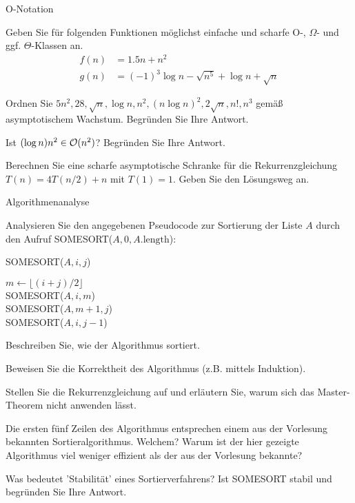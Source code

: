\documentclass{exercisesheet}
\begin{document}
\begin{exercises}{O-Notation}
\item Geben Sie für folgenden Funktionen möglichst einfache und scharfe O-, $\Omega$- und ggf. $\Theta$-Klassen an.
\begin{align*}
  f(n) & = 1.5n + n^2                                     \\
  g(n) & = (-1)^3 \log n - \sqrt{n^5} + \log n + \sqrt{n}
\end{align*}
\item Ordnen Sie $5n^2, 28, \sqrt{n}, \log n, n^2, (n \log n)^2, 2\sqrt{n}, n!, n^3$ gemäß asymptotischem Wachstum. Begründen Sie Ihre Antwort.
\item Ist $(\log n)n^2 \in \mathcal{O}(n^2)$? Begründen Sie Ihre Antwort.
\item Berechnen Sie eine scharfe asymptotische Schranke für die Rekurrenzgleichung $T(n) = 4T(n/2) + n$ mit $T(1) = 1$. Geben Sie den Lösungsweg an.
\end{exercises}

\begin{eexercises}{Algorithmenanalyse}{
    Analysieren Sie den angegebenen Pseudocode zur Sortierung der Liste $A$ durch den Aufruf SOMESORT($A, 0, A.\text{length}$):
    \begin{algorithm}[ht]
      \caption{SOMESORT($A, i, j$)}
      $m \gets \lfloor (i+j)/2 \rfloor$ \\
      SOMESORT($A, i, m$) \\
      SOMESORT($A, m+1, j$) \\
      SOMESORT($A, i, j-1$)
    \end{algorithm}
  }
  \item Beschreiben Sie, wie der Algorithmus sortiert.
  \item Beweisen Sie die Korrektheit des Algorithmus (z.B. mittels Induktion).
  \item Stellen Sie die Rekurrenzgleichung auf und erläutern Sie, warum sich das Master-Theorem nicht anwenden lässt.
  \item Die ersten fünf Zeilen des Algorithmus entsprechen einem aus der Vorlesung bekannten Sortieralgorithmus. Welchem? Warum ist der hier gezeigte Algorithmus viel weniger effizient als der aus der Vorlesung bekannte?
  \item Was bedeutet 'Stabilität' eines Sortierverfahrens? Ist SOMESORT stabil und begründen Sie Ihre Antwort.
\end{eexercises}
\end{document}
